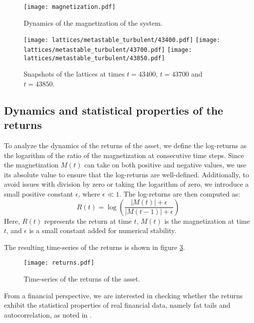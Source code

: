 \begin{figure}[H]
    \centering
    \texttt{[image: magnetization.pdf]}
    \caption{Dynamics of the magnetization of the system.}
    \label{fig:magnetization}
\end{figure}

\begin{figure}[H]
    \centering
    \texttt{[image: lattices/metastable\_turbulent/43400.pdf]}
    \texttt{[image: lattices/metastable\_turbulent/43700.pdf]}
    \texttt{[image: lattices/metastable\_turbulent/43850.pdf]}
    \caption{Snapshots of the lattices at times $t=43400$, $t=43700$ and $t=43850$.}
    \label{fig:lattices}
\end{figure}

\subsection{Dynamics and statistical properties of the returns}
To analyze the dynamics of the returns of the asset, we define the log-returns as the logarithm of the ratio of the magnetization at consecutive time steps. Since the magnetization $M(t)$ can take on both positive and negative values, we use its absolute value to ensure that the log-returns are well-defined. Additionally, to avoid issues with division by zero or taking the logarithm of zero, we introduce a small positive constant $\epsilon$, where $\epsilon \ll 1$. The log-returns are then computed as:
\begin{equation}
    R(t) = \log\left(\frac{|M(t)| + \epsilon}{|M(t-1)| + \epsilon}\right)
\end{equation}
Here, $R(t)$ represents the return at time $t$, $M(t)$ is the magnetization at time $t$, and $\epsilon$ is a small constant added for numerical stability.

The resulting time-series of the returns is shown in figure \ref{fig:returns}.

\begin{figure}[H]
    \centering
    \texttt{[image: returns.pdf]}
    \caption{Time-series of the returns of the asset.}
    \label{fig:returns}
\end{figure}

From a financial perspective, we are interested in checking whether the returns exhibit the statistical properties of real financial data, namely fat tails and autocorrelation, as noted in \cite{bouchaud2000theory}.

